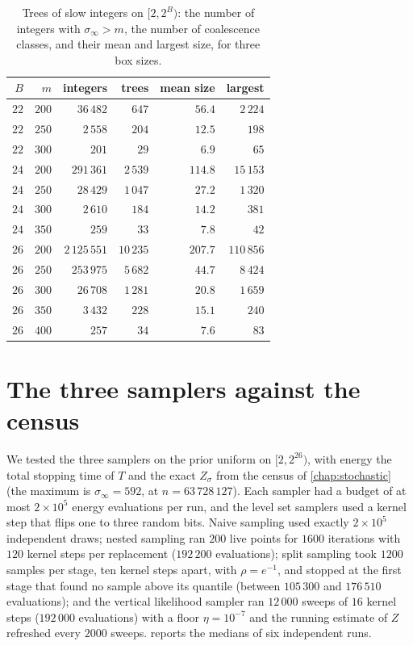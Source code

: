 \begin{table}[t]
\centering\small
\caption{Trees of slow integers on $[2,2^B)$: the number of integers with
$\sigma_\infty>m$, the number of coalescence classes, and their mean and
largest size, for three box sizes.}
\label{tab:ch10b:trees}
\setlength{\tabcolsep}{4pt}\begin{tabular}{@{}rrrrrr@{}}
\toprule
$B$ & $m$ & integers & trees & mean size & largest \\
\midrule
$22$ & $200$ & $36\,482$ & $647$ & $56.4$ & $2\,224$ \\
$22$ & $250$ & $2\,558$ & $204$ & $12.5$ & $198$ \\
$22$ & $300$ & $201$ & $29$ & $6.9$ & $65$ \\
$24$ & $200$ & $291\,361$ & $2\,539$ & $114.8$ & $15\,153$ \\
$24$ & $250$ & $28\,429$ & $1\,047$ & $27.2$ & $1\,320$ \\
$24$ & $300$ & $2\,610$ & $184$ & $14.2$ & $381$ \\
$24$ & $350$ & $259$ & $33$ & $7.8$ & $42$ \\
$26$ & $200$ & $2\,125\,551$ & $10\,235$ & $207.7$ & $110\,856$ \\
$26$ & $250$ & $253\,975$ & $5\,682$ & $44.7$ & $8\,424$ \\
$26$ & $300$ & $26\,708$ & $1\,281$ & $20.8$ & $1\,659$ \\
$26$ & $350$ & $3\,432$ & $228$ & $15.1$ & $240$ \\
$26$ & $400$ & $257$ & $34$ & $7.6$ & $83$ \\
\bottomrule
\end{tabular}
\end{table}

\section{The three samplers against the census}

We tested the three samplers on the prior uniform on $[2,2^{26})$, with energy
the total stopping time of $T$ and the exact $Z_\sigma$ from the census of
\cref{chap:stochastic} (the maximum is $\sigma_\infty=592$, at
$n=63\,728\,127$). Each sampler had a budget of at most $2\times10^5$ energy evaluations per run, and the level set samplers used a kernel step that flips one to three random bits. Naive sampling used exactly $2\times10^5$ independent draws; nested sampling ran $200$ live points for $1600$ iterations with $120$ kernel steps per replacement ($192\,200$ evaluations); split sampling took $1200$ samples per stage, ten kernel steps apart, with $\rho=e^{-1}$, and stopped at the first stage that found no sample above its quantile (between $105\,300$ and $176\,510$ evaluations); and the vertical likelihood sampler ran $12\,000$ sweeps of $16$ kernel steps ($192\,000$ evaluations) with a floor $\eta=10^{-7}$ and the running estimate of $Z$ refreshed every $2000$ sweeps.
 reports the medians of six independent runs.


